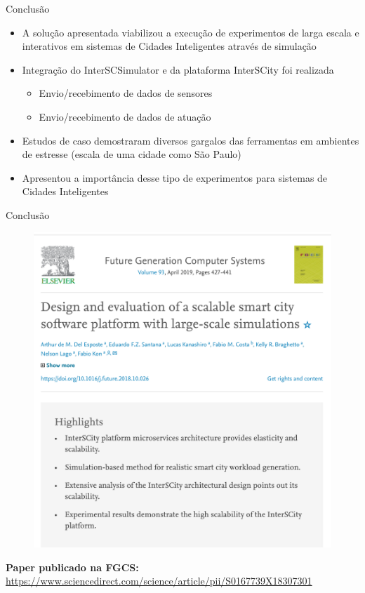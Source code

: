 \documentclass[xcolor={usenames,svgnames,dvipsnames},brazil,english,12pt,aspectratio=149]{beamer}
\begin{document}
\begin{frame}{Conclusão}
    \begin{itemize}
        \item A solução apresentada viabilizou a execução de experimentos de larga escala e interativos em sistemas de Cidades Inteligentes através de simulação
        \item Integração do InterSCSimulator e da plataforma InterSCity foi realizada
            \begin{itemize}
                \item Envio/recebimento de dados de sensores
                \item Envio/recebimento de dados de atuação
            \end{itemize}
        \item Estudos de caso demostraram diversos gargalos das ferramentas em ambientes de estresse (escala de uma cidade como São Paulo)
        \item Apresentou a importância desse tipo de experimentos para sistemas de Cidades Inteligentes
    \end{itemize}
\end{frame}

\begin{frame}{Conclusão}
     \begin{figure}[ht]
        \centering
        \includegraphics[width=.4\textwidth]{paper.png}
    \end{figure}
    
    \begin{center}
        \textbf{Paper publicado na FGCS:} \url{https://www.sciencedirect.com/science/article/pii/S0167739X18307301}
    \end{center}
\end{frame}
\end{document}
